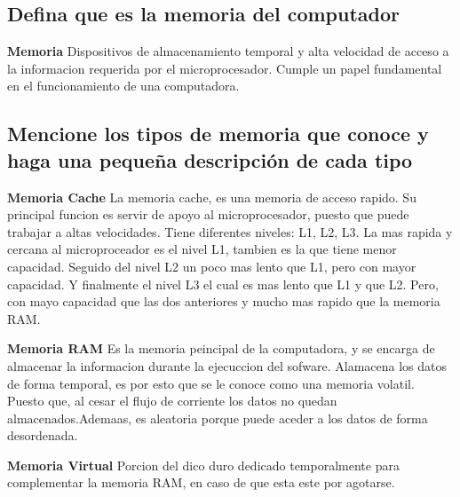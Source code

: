 \documentclass{article}
\begin{document}
	\subsection{Defina que es la memoria del computador}
	
	
	\begin{tcolorbox}[colupper=red!75!black]
		\textbf{Memoria}
		\tcblower
		Dispositivos de almacenamiento temporal y alta velocidad de acceso a la informacion requerida por el microprocesador. Cumple un papel fundamental en el funcionamiento de una computadora.
	\end{tcolorbox}
	
	\subsection{Mencione los tipos de memoria que conoce y haga una pequeña descripción de cada tipo}
	
	\begin{tcolorbox}[colupper=red!75!black]
		\textbf{Memoria Cache}
		\tcblower
		La memoria cache, es una memoria de acceso rapido. Su principal funcion es servir de apoyo al microprocesador, puesto que puede trabajar a altas velocidades. Tiene diferentes niveles: L1, L2, L3. La mas rapida y cercana al microproceador es el nivel L1, tambien es la que tiene menor capacidad. Seguido del nivel L2 un poco mas lento que L1, pero con mayor capacidad. Y finalmente el nivel L3 el cual es mas lento que L1 y que L2. Pero, con mayo capacidad que las dos anteriores y mucho mas rapido que la memoria RAM.
	\end{tcolorbox}
	
	\begin{tcolorbox}[colupper=red!75!black]
		\textbf{Memoria RAM}
		\tcblower
		Es la memoria peincipal de la computadora, y se encarga de almacenar la informacion durante la ejecuccion del sofware. Alamacena los datos de forma temporal, es por esto que se le conoce como una memoria volatil. Puesto que, al cesar el flujo de corriente los datos no quedan almacenados.Ademaas, es aleatoria porque puede aceder a los datos de forma desordenada.
	\end{tcolorbox}
	
	\begin{tcolorbox}[colupper=red!75!black]
		\textbf{Memoria Virtual}
		\tcblower
		Porcion del dico duro dedicado temporalmente para complementar la memoria RAM, en caso de que esta este por agotarse.
	\end{tcolorbox}
	
\end{document}
